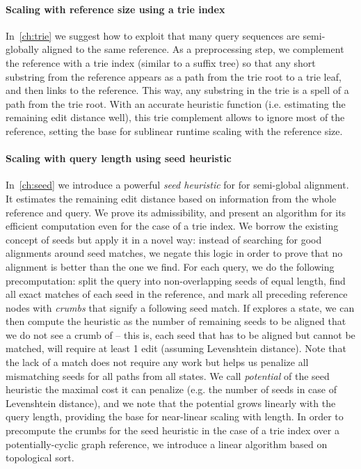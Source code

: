\paragraph{Scaling with reference size using a trie index}
In~\cref{ch:trie} we suggest how to exploit that many query sequences are
semi-globally aligned to the same reference. As a preprocessing step, we
complement the reference with a trie index (similar to a suffix tree) so that
any short substring from the reference appears as a path from the trie root to a
trie leaf, and then links to the reference. This way, any substring in the trie
is a spell of a path from the trie root. With an accurate heuristic function
(i.e. estimating the remaining edit distance well), this trie complement allows
to ignore most of the reference, setting the base for sublinear runtime scaling
with the reference size.

\paragraph{Scaling with query length using seed heuristic}
In~\cref{ch:seed} we introduce a powerful \emph{seed heuristic} for \A for
semi-global alignment. It estimates the remaining edit distance based on
information from the whole reference and query. We prove its admissibility, and
present an algorithm for its efficient computation even for the case of a trie
index. We borrow the existing concept of seeds but apply it in a novel way:
instead of searching for good alignments around seed matches, we negate this
logic in order to prove that no alignment is better than the one we find. For
each query, we do the following precomputation: split the query into
non-overlapping seeds of equal length, find all exact matches of each seed in
the reference, and mark all preceding reference nodes with \emph{crumbs} that
signify a following seed match. If \A explores a state, we can then compute the
heuristic as the number of remaining seeds to be aligned that we do not see a
crumb of -- this is, each seed that has to be aligned but cannot be matched,
will require at least 1 edit (assuming Levenshtein distance). Note that the lack
of a match does not require any work but helps us penalize all mismatching seeds
for all paths from all states. We call \emph{potential} of the seed heuristic
the maximal cost it can penalize (e.g. the number of seeds in case of
Levenshtein distance), and we note that the potential grows linearly with the
query length, providing the base for near-linear scaling with length. In order
to precompute the crumbs for the seed heuristic in the case of a trie index over
a potentially-cyclic graph reference, we introduce a linear algorithm based on
topological sort.

